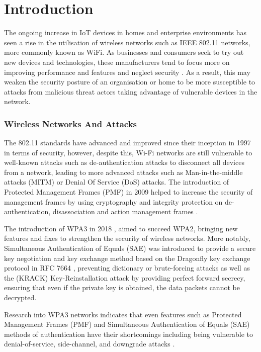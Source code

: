 
\section{Introduction}
\label{sec:Introduction} 

The ongoing increase in IoT devices in homes and enterprise environments has seen a rise in the utilisation of wireless networks such as IEEE 802.11 networks, more commonly known as WiFi. As businesses and consumers seek to try out new devices and technologies, these manufacturers tend to focus more on improving performance and features and neglect security \parencite{roundy_iot_nodate}. As a result, this may weaken the security posture of an organisation or home to be more susceptible to attacks from malicious threat actors taking advantage of vulnerable devices in the network.


\subsubsection{Wireless Networks And Attacks}
\smallskip

The 802.11 standards have advanced and improved since their inception in 1997 in terms of security, however, despite this, Wi-Fi networks are still vulnerable to well-known attacks such as de-authentication attacks to disconnect all devices from a network, leading to more advanced attacks such as Man-in-the-middle attacks (MITM) or Denial Of Service (DoS) attacks. The introduction of Protected Management Frames (PMF) in 2009 \parencite{5278657} helped to increase the security of management frames by using cryptography and integrity protection on de-authentication, disassociation and action management frames \parencite{9249426}. 

The introduction of WPA3 in 2018 \parencite{wifialliance_2022_wpa3}, aimed to succeed WPA2, bringing new features and fixes to strengthen the security of wireless networks. More notably, Simultaneous Authentication of Equals (SAE) was introduced to provide a secure key negotiation and key exchange method based on the Dragonfly key exchange protocol in RFC 7664 \parencite{rfc7664}, preventing dictionary or brute-forcing attacks as well as the (KRACK) Key-Reinstallation attack \parencite{krack} by providing perfect forward secrecy, ensuring that even if the private key is obtained, the data packets cannot be decrypted. 

Research into WPA3 networks indicates that even features such as Protected Management Frames (PMF) and Simultaneous Authentication of Equals (SAE) methods of authentication have their shortcomings including being vulnerable to denial-of-service, side-channel, and downgrade attacks \parencite{vanhoef-sp2020-dragonblood}.


